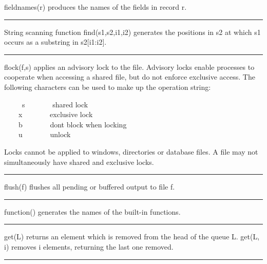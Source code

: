\noindent
{}fieldnames(r) produces the names of the fields in
record r.

\bigskip\hrule\vspace{0.1cm}

\noindent
{}String scanning function find(s1,s2,i1,i2) generates
the positions in s2 at which s1 occurs as a substring in s2[i1:i2].

\bigskip\hrule\vspace{0.1cm}

\noindent
{}flock(f,s) applies an advisory
lock to the file. Advisory locks enable processes to
cooperate when accessing a shared file, but do not enforce exclusive
access. The following characters can be used to make up the operation
string: 

\ \ \ \ \ s \ \ \ \ \ \ \ shared lock\\
 \ \ \ \ x \ \ \ \ \ \ \ exclusive lock\\
 \ \ \ \ b \ \ \ \ \ \ \ don{\textquotesingle}t block when
locking\\
 \ \ \ \ u \ \ \ \ \ \ \ unlock 

Locks cannot be applied to windows, directories or database files. A
file may not simultaneously have shared and exclusive locks.

\bigskip\hrule\vspace{0.1cm}

\noindent
{}\textsf{flush(f)} flushes all pending or buffered output
to file \textsf{f}.

\bigskip\hrule\vspace{0.1cm}

\noindent
\textsf{function()} generates the names of the built-in functions.

\bigskip\hrule\vspace{0.1cm}

\noindent
\textsf{get(L)} returns an element which is removed from the head of the
queue \textsf{L}. \textsf{get(L, i)} removes \textsf{i}
elements, returning the last one removed.

\bigskip\hrule\vspace{0.1cm}

